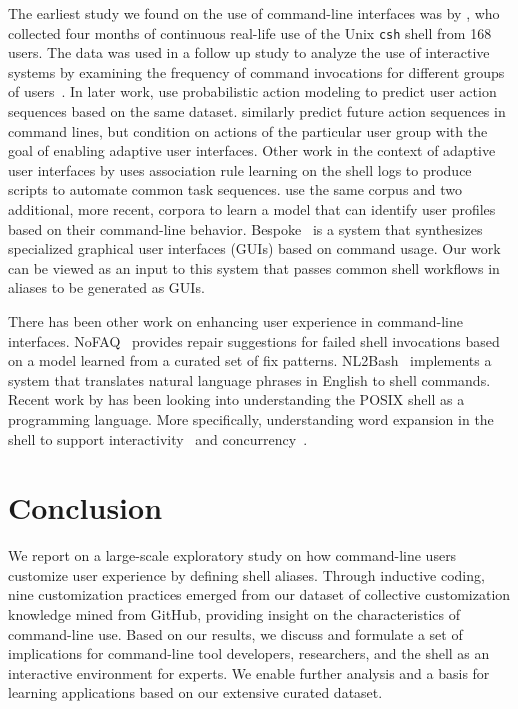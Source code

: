 \documentclass[smallextended,natbib]{svjour3}
\begin{document}
The earliest study we found on the use of command-line interfaces was by \cite{greenberg:88a}, who collected four months of continuous real-life use of the Unix \verb|csh| shell from 168 users. 
The data was used in a follow up study to analyze the use of interactive systems by examining the frequency of command invocations for different groups of users~\citep{greenberg:88b}.
In later work, \cite{davison:98} use probabilistic action modeling to predict user action sequences based on the same dataset.
\cite{korvemaker:00} similarly predict future action sequences in command lines, but condition on actions of the particular user group with the goal of enabling adaptive user interfaces.
Other work in the context of adaptive user interfaces by \cite{jacobs:01} uses association rule learning on the shell logs to produce scripts to automate common task sequences.
\cite{khosmood:14} use the same corpus and two additional, more recent, corpora to learn a model that can identify user profiles based on their command-line behavior.
Bespoke~\citep{bespoke:19} is a system that synthesizes specialized graphical user interfaces (GUIs) based on command usage.
Our work can be viewed as an input to this system that passes common shell workflows in aliases to be generated as GUIs.

There has been other work on enhancing user experience in command-line interfaces.
NoFAQ~\citep{dantoni:17} provides repair suggestions for failed shell invocations based on a model learned from a curated set of fix patterns.
NL2Bash~\citep{lin:18} implements a system that translates natural language phrases in English to shell commands.
Recent work by \cite{greenberg:17} has been looking into understanding the POSIX shell as a programming language.
More specifically, understanding word expansion in the shell to support interactivity~\citep{greenberg:18a} and concurrency~\citep{greenberg:18b}.

\section{Conclusion}

We report on a large-scale exploratory study on how command-line users customize user experience by defining shell aliases.
Through inductive coding, nine customization practices emerged from our dataset of collective customization knowledge mined from GitHub, providing insight on the characteristics of command-line use.
Based on our results, we discuss and formulate a set of implications for command-line tool developers, researchers, and the shell as an interactive environment for experts.
We enable further analysis and a basis for learning applications based on our extensive curated dataset.
\end{document}
